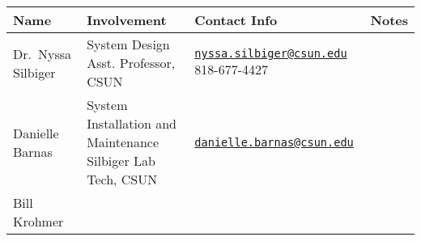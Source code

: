 \documentclass[]{book}
\begin{document}
\begin{longtable}[]{@{}llll@{}}
\toprule
\begin{minipage}[b]{0.07\columnwidth}\raggedright\strut
Name\strut
\end{minipage} & \begin{minipage}[b]{0.17\columnwidth}\raggedright\strut
Involvement\strut
\end{minipage} & \begin{minipage}[b]{0.18\columnwidth}\raggedright\strut
Contact Info\strut
\end{minipage} & \begin{minipage}[b]{0.09\columnwidth}\raggedright\strut
Notes\strut
\end{minipage}\tabularnewline
\midrule
\endhead
\begin{minipage}[t]{0.07\columnwidth}\raggedright\strut
Dr.~Nyssa Silbiger\strut
\end{minipage} & \begin{minipage}[t]{0.17\columnwidth}\raggedright\strut
System Design Asst. Professor, CSUN\strut
\end{minipage} & \begin{minipage}[t]{0.18\columnwidth}\raggedright\strut
\href{mailto:nyssa.silbiger@csun.edu}{\nolinkurl{nyssa.silbiger@csun.edu}}
818-677-4427\strut
\end{minipage} & \begin{minipage}[t]{0.09\columnwidth}\raggedright\strut
\strut
\end{minipage}\tabularnewline
\begin{minipage}[t]{0.07\columnwidth}\raggedright\strut
Danielle Barnas\strut
\end{minipage} & \begin{minipage}[t]{0.17\columnwidth}\raggedright\strut
System Installation and Maintenance Silbiger Lab Tech, CSUN\strut
\end{minipage} & \begin{minipage}[t]{0.18\columnwidth}\raggedright\strut
\href{mailto:danielle.barnas@csun.edu}{\nolinkurl{danielle.barnas@csun.edu}}\strut
\end{minipage} & \begin{minipage}[t]{0.09\columnwidth}\raggedright\strut
\strut
\end{minipage}\tabularnewline
\begin{minipage}[t]{0.07\columnwidth}\raggedright\strut
Bill Krohmer\strut
\end{minipage} & \begin{minipage}[t]{0.17\columnwidth}\raggedright\strut

\end{minipage}
\end{longtable}
\end{document}
